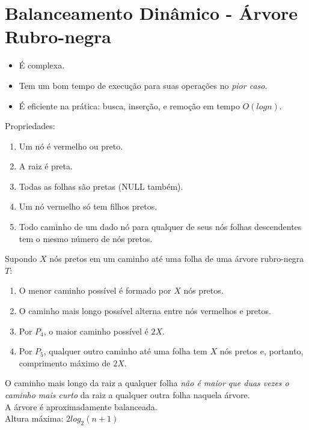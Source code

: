 
\section{Balanceamento Dinâmico - Árvore Rubro-negra}
\begin{frame}[label=notas]
	\begin{itemize}
		\item	É complexa.\pause
		\item Tem um bom tempo de execução para suas operações no \emph{pior caso}.\pause
		\item É eficiente na prática: busca, inserção, e remoção em tempo $O(log n)$.
	\end{itemize}
	\pause\vfill
	Propriedades:
	\begin{enumerate}
		\item[$P_1$] Um nó é vermelho ou preto.
		\item[$P_2$] A raiz é preta.
		\item[$P_3$] Todas as folhas são pretas (NULL também).
		\item[$P_4$] Um nó vermelho só tem filhos pretos.
		\item[$P_5$] Todo caminho de um dado nó para qualquer de seus nós folhas descendentes tem o mesmo número de nós pretos.
	\end{enumerate}
\end{frame}

\begin{frame}[label=notas]
	Supondo $X$ nós pretos em um caminho até uma folha de uma árvore rubro-negra $T$:
	\begin{enumerate}
		\item O menor caminho possível é formado por $X$ nós pretos.\pause
		\item O caminho mais longo possível alterna entre nós vermelhos e pretos.\pause
		\item Por $P_4$, o maior caminho possível é $2X$.\pause
		\item Por $P_5$,  qualquer outro caminho até uma folha tem $X$ nós pretos \pause e, portanto, comprimento máximo de  $2X$.
	\end{enumerate}
	\vfill\pause
	O caminho mais longo da raiz a qualquer folha \emph{não é maior que duas vezes o caminho mais curto} da raiz a qualquer outra folha naquela árvore.	
	\\\vfill\pause
	A árvore é \alert{aproximadamente balanceada}. 
	\\\vfill\pause
	Altura máxima: \pause $2log_2(n+1)$
\end{frame}

